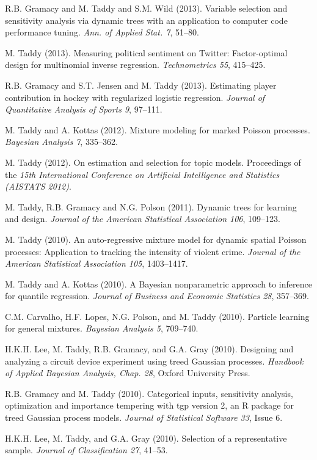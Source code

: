 \documentclass[margin,line]{res}
\begin{document}
\begin{resume}
R.B. Gramacy and M. Taddy and S.M. Wild (2013).  Variable selection and
sensitivity analysis via dynamic trees with an application to computer
code performance tuning.  {\it Ann. of Applied
  Stat. 7}, 51--80.

M. Taddy (2013).  Measuring political sentiment on Twitter: Factor-optimal
design for multinomial inverse regression. {\it
  Technometrics 55}, 415--425.


R.B. Gramacy and S.T. Jensen and M. Taddy (2013).  Estimating player contribution in 
hockey with regularized logistic regression. {\it Journal of Quantitative Analysis of Sports 9}, 97--111.

M.  Taddy and A. Kottas (2012). Mixture modeling for marked Poisson processes.
{\it Bayesian Analysis 7}, 335--362.


M. Taddy (2012). On estimation and selection for topic models. Proceedings of the {\it 15th International Conference on
  Artificial Intelligence and Statistics (AISTATS 2012)}.


M. Taddy, R.B. Gramacy and N.G. Polson (2011). Dynamic trees for learning and design.
 {\it Journal of the American Statistical
  Association 106}, 109--123.

M. Taddy (2010). An auto-regressive mixture model for dynamic spatial
Poisson processes: Application to tracking the intensity of violent
crime.  {\it Journal of the American Statistical
  Association 105}, 1403--1417.

M.  Taddy and A. Kottas (2010). A Bayesian nonparametric approach to inference for quantile regression.
{\it Journal of Business and Economic Statistics 28}, 357--369.

C.M. Carvalho, H.F. Lopes, N.G. Polson, and M. Taddy
(2010). Particle learning for general mixtures.  {\it Bayesian
  Analysis 5}, 709--740.

H.K.H. Lee, M. Taddy, R.B. Gramacy, and G.A. Gray
(2010). Designing and analyzing a circuit device experiment using
treed Gaussian processes.  {\it Handbook of Applied
  Bayesian Analysis, Chap. 28}, Oxford University Press.

R.B. Gramacy and M. Taddy (2010). Categorical inputs, sensitivity
       analysis, optimization and importance tempering with tgp version 2, an
       R package for treed Gaussian process models. {\it Journal of Statistical Software 33}, Issue 6.


H.K.H. Lee, M. Taddy, and G.A. Gray (2010). Selection of a representative sample.
{\it Journal of Classification 27}, 41--53.


\end{resume}
\end{document}
